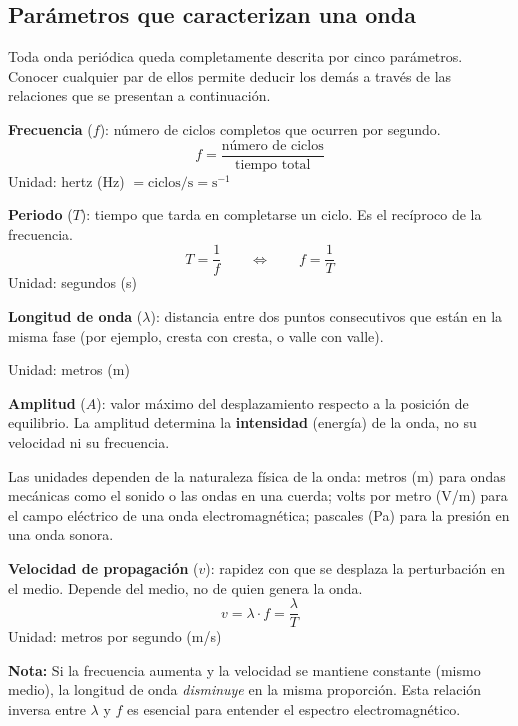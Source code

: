\subsection{Parámetros que caracterizan una onda}
\begin{seccion}
Toda onda periódica queda completamente descrita por cinco parámetros. Conocer cualquier par de ellos permite deducir los demás a través de las relaciones que se presentan a continuación.

\begin{ecuacion}
\textbf{Frecuencia} ($f$): número de ciclos completos que ocurren por segundo.
$$f = \frac{\text{número de ciclos}}{\text{tiempo total}}$$
Unidad: hertz (Hz) $= \text{ciclos/s} = \text{s}^{-1}$
\end{ecuacion}

\begin{ecuacion}
\textbf{Periodo} ($T$): tiempo que tarda en completarse un ciclo. Es el recíproco de la frecuencia.
$$T = \frac{1}{f} \qquad \Longleftrightarrow \qquad f = \frac{1}{T}$$
Unidad: segundos (s)
\end{ecuacion}

\begin{ecuacion}
\textbf{Longitud de onda} ($\lambda$): distancia entre dos puntos consecutivos que están en la misma fase (por ejemplo, cresta con cresta, o valle con valle).

Unidad: metros (m)
\end{ecuacion}

\begin{ecuacion}
\textbf{Amplitud} ($A$): valor máximo del desplazamiento respecto a la posición de equilibrio. La amplitud determina la \textbf{intensidad} (energía) de la onda, no su velocidad ni su frecuencia.

Las unidades dependen de la naturaleza física de la onda: metros (m) para ondas mecánicas como el sonido o las ondas en una cuerda; volts por metro (V/m) para el campo eléctrico de una onda electromagnética; pascales (Pa) para la presión en una onda sonora.
\end{ecuacion}

\begin{ecuacion}
\textbf{Velocidad de propagación} ($v$): rapidez con que se desplaza la perturbación en el medio. Depende del medio, no de quien genera la onda.
$$v = \lambda \cdot f = \frac{\lambda}{T}$$
Unidad: metros por segundo (m/s)
\end{ecuacion}

\begin{nota}
\textbf{Nota:} Si la frecuencia aumenta y la velocidad se mantiene constante (mismo medio), la longitud de onda \textit{disminuye} en la misma proporción. Esta relación inversa entre $\lambda$ y $f$ es esencial para entender el espectro electromagnético.
\end{nota}
\end{seccion}

